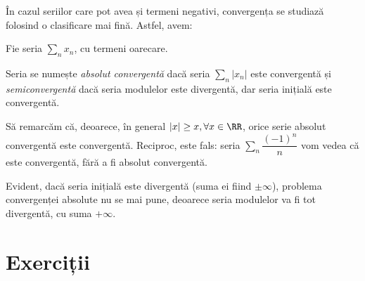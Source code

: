 În cazul seriilor care pot avea și termeni negativi, convergența se studiază
folosind o clasificare mai fină. Astfel, avem:

\begin{definition}\label{def:ac-semi} 
  Fie seria $ \sum_n x_n $, cu termeni oarecare.

  Seria se numește \emph{absolut convergentă} dacă seria $ \sum_n |x_n| $ este
  convergentă și \emph{semiconvergentă} dacă seria modulelor este divergentă,
  dar seria inițială este convergentă.
\end{definition}

Să remarcăm că, deoarece, în general $ |x| \geq x, \forall x \in \RR $,
orice serie absolut convergentă este convergentă. Reciproc, este fals:
seria $ \sum_n \dfrac{(-1)^n}{n} $ vom vedea că este convergentă,
fără a fi absolut convergentă.

Evident, dacă seria inițială este divergentă (suma ei fiind $ \pm \infty $),
problema convergenței absolute nu se mai pune, deoarece seria modulelor
va fi tot divergentă, cu suma $ +\infty $.


\section{Exerciții}


